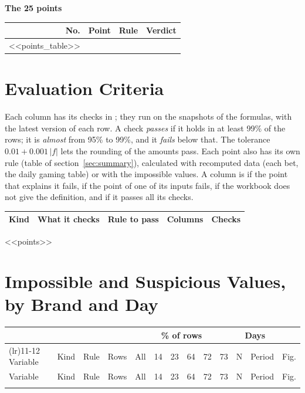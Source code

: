 \textbf{The 25 points}

\begin{small}
\begin{longtable}{@{}r>{\raggedright\arraybackslash}p{4.2cm}>{\raggedright\arraybackslash}p{8.2cm}l@{}}
\toprule
No. & Point & Rule & Verdict\\
\midrule
\endhead
\bottomrule
\endfoot
<<points_table>>
\end{longtable}
\end{small}

\section{Evaluation Criteria}\label{sec:criteria}
Each column has its checks in ; they run on the snapshots of the formulas, with the latest version of each row. A check \emph{passes} if it holds in at least 99\% of the rows; it is \emph{almost} from 95\% to 99\%, and it \emph{fails} below that. The tolerance $0.01 + 0.001\,|f|$ lets the rounding of the amounts pass. Each point also has its own rule (table of section~\ref{sec:summary}), calculated with recomputed data (each bet, the daily gaming table) or with the impossible values. A column is \stWrong{} if the point that explains it fails, \stAffected{} if the point of one of its inputs fails, \stUnconfirmed{} if the workbook does not give the definition, and \stCorrect{} if it passes all its checks.

\begin{center}\small
\begin{tabular}{@{}>{\raggedright\arraybackslash}p{1.9cm}>{\raggedright\arraybackslash}p{5.8cm}>{\raggedright\arraybackslash}p{4.3cm}rr@{}}
\toprule
Kind & What it checks & Rule to pass & Columns & Checks\\
\midrule

\end{tabular}
\end{center}

<<points>>

\section{Impossible and Suspicious Values, by Brand and Day}\label{sec:flags}
\begin{footnotesize}
\setlength{\tabcolsep}{2pt}
\begin{longtable}{@{}>{\raggedright\arraybackslash}p{2.5cm}l>{\raggedright\arraybackslash}p{2.1cm}rrrrrrrrlr@{}}
\toprule
& & & & \multicolumn{6}{c}{\% of rows} & \multicolumn{2}{c}{Days} & \\
\cmidrule(lr){5-10}\cmidrule(lr){11-12}
Variable & Kind & Rule & Rows & All & 14 & 23 & 64 & 72 & 73 & N & Period & Fig.\\
\midrule
\endfirsthead
\toprule
Variable & Kind & Rule & Rows & All & 14 & 23 & 64 & 72 & 73 & N & Period & Fig.\\
\midrule
\endhead
\bottomrule
\endfoot

\end{longtable}
\end{footnotesize}

